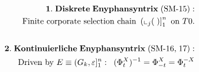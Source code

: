 \documentclass[preview]{standalone}
\begin{document}
\begin{align*}
\special{dvisvgm:raw <g id='unique000'>}\mathbf{1.\;Diskrete\;Enyphansyntrix\;(\text{SM-15}):}\\\text{Finite corporate selection chain }\left(\llcorner_j(\;)\right]_1^n\text{ on }T0.\\[18pt]\mathbf{2.\;Kontinuierliche\;Enyphansyntrix\;(\text{SM-16,\;17}):}\\\text{Driven by }E\equiv(G_k,\varepsilon]_1^n:\;\; (\Phi_t^X)^{-1} = \Phi_{-t}^X = \Phi_t^{-X}\special{dvisvgm:raw </g>}
\end{align*}
\end{document}
